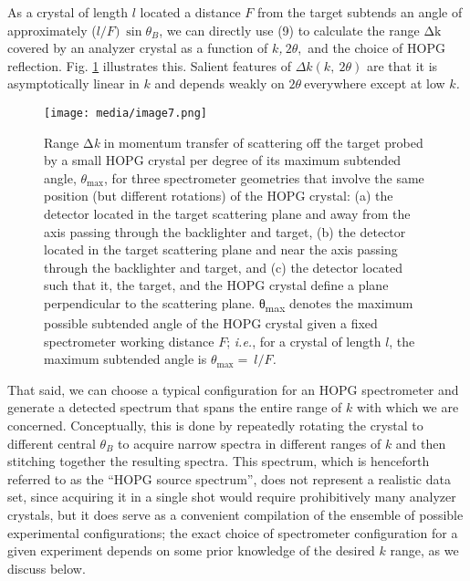 As a crystal of length \(l\) located a distance \(F\) from the target
subtends an angle of approximately (\(l/F)\ \sin\theta_{B}\), we can
directly use (9) to calculate the range \(\text{Δk}\) covered by an
analyzer crystal as a function of \(k\)\emph{,}\(\ 2\theta,\) and the
choice of HOPG reflection. Fig. \ref{edimage7} illustrates this. Salient features of
\(\Delta k(k,\ 2\theta)\) are that it is asymptotically linear in \(k\)
and depends weakly on \(2\theta\ \)everywhere except at low
\(k\)\emph{.}

\begin{figure}[h] 
\caption{ Range Δ\emph{k} in momentum transfer of scattering off the
target probed by a small HOPG crystal per degree of its maximum
subtended angle, \(\theta_{\max}\), for three spectrometer geometries
that involve the same position (but different rotations) of the HOPG
crystal: (a) the detector located in the target scattering plane and
away from the axis passing through the backlighter and target, (b) the
detector located in the target scattering plane and near the axis
passing through the backlighter and target, and (c) the detector located
such that it, the target, and the HOPG crystal define a plane
perpendicular to the scattering plane. θ\textsubscript{max} denotes the
maximum possible subtended angle of the HOPG crystal given a fixed
spectrometer working distance \(F\); \emph{i.e.}, for a crystal of
length \(l\), the maximum subtended angle is
\(\theta_{\max} = \ l/F\)\emph{.}}
\label{edimage7}
\centering
\texttt{[image: media/image7.png]}
\end{figure}

That said, we can choose a typical configuration for an HOPG
spectrometer and generate a detected spectrum that spans the entire
range of \(k\) with which we are concerned. Conceptually, this is done
by repeatedly rotating the crystal to different central \(\theta_{B}\)
to acquire narrow spectra in different ranges of \(k\) and then
stitching together the resulting spectra. This spectrum, which is
henceforth referred to as the ``HOPG source spectrum'', does not
represent a realistic data set, since acquiring it in a single shot
would require prohibitively many analyzer crystals, but it does serve as
a convenient compilation of the ensemble of possible experimental
configurations; the exact choice of spectrometer configuration for a
given experiment depends on some prior knowledge of the desired \(k\)
range, as we discuss below.

